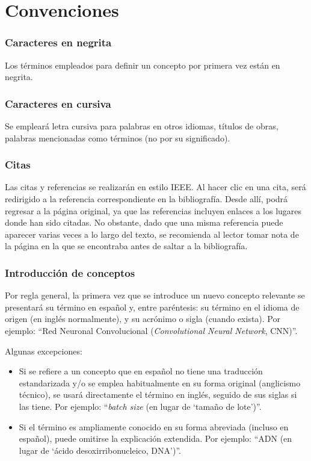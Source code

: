\chapter*{Convenciones}

\subsection*{Caracteres en negrita}

Los términos empleados para definir un concepto por primera vez están en negrita.


\subsection*{Caracteres en cursiva}

Se empleará letra cursiva para palabras en otros idiomas, títulos de obras, palabras mencionadas como términos
(no por su significado).


\subsection*{Citas}

Las citas y referencias se realizarán en estilo IEEE.
Al hacer clic en una cita, será redirigido a la referencia correspondiente en la bibliografía. Desde allí, 
podrá regresar a la página original, ya que las referencias incluyen enlaces a los lugares donde han sido 
citadas. No obstante, dado que una misma referencia puede aparecer varias veces a lo largo del texto, se 
recomienda al lector tomar nota de la página en la que se encontraba antes de saltar a la bibliografía.


\subsection*{Introducción de conceptos}

Por regla general, la primera vez que se introduce un nuevo concepto relevante  se presentará su término en 
español y, entre paréntesis: su término en el idioma de origen (en inglés normalmente), y su acrónimo o sigla 
(cuando exista). 
Por ejemplo: ``Red Neuronal Convolucional (\textit{Convolutional Neural Network}, CNN)''.

Algunas excepciones:

\begin{itemize}
    
    \item Si se refiere a un concepto que en español no tiene una traducción estandarizada y/o se emplea 
    habitualmente en su forma original (anglicismo técnico), se usará directamente el término en inglés, 
    seguido de sus siglas si las tiene.
    Por ejemplo: ``\textit{batch size} (en lugar de `tamaño de lote')''.

    \item Si el término es ampliamente conocido en su forma abreviada (incluso en español), puede omitirse la 
    explicación extendida. 
    Por ejemplo: ``ADN (en lugar de `ácido desoxirribonucleico, DNA')''.

\end{itemize}


